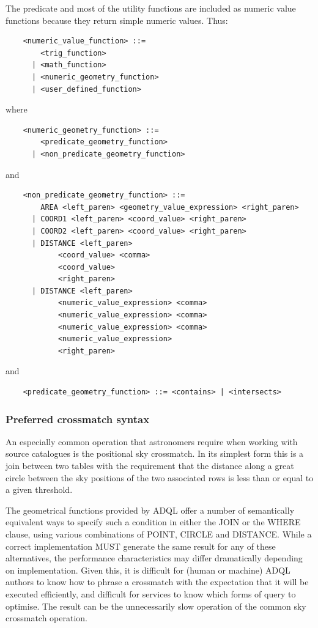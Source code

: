 \documentclass[11pt,a4paper]{ivoa}
\begin{document}
The predicate and most of the utility functions are included as numeric
value functions because they return simple numeric values.
Thus:
\begin{verbatim}
    <numeric_value_function> ::=
        <trig_function>
      | <math_function>
      | <numeric_geometry_function>
      | <user_defined_function>
\end{verbatim}
\noindent
where
\begin{verbatim}
    <numeric_geometry_function> ::=
        <predicate_geometry_function>
      | <non_predicate_geometry_function>
\end{verbatim}
\noindent
and
\begin{verbatim}
    <non_predicate_geometry_function> ::=
        AREA <left_paren> <geometry_value_expression> <right_paren>
      | COORD1 <left_paren> <coord_value> <right_paren>
      | COORD2 <left_paren> <coord_value> <right_paren>
      | DISTANCE <left_paren>
            <coord_value> <comma>
            <coord_value>
            <right_paren>
      | DISTANCE <left_paren>
            <numeric_value_expression> <comma>
            <numeric_value_expression> <comma>
            <numeric_value_expression> <comma>
            <numeric_value_expression>
            <right_paren>
\end{verbatim}
\noindent
and
\begin{verbatim}
    <predicate_geometry_function> ::= <contains> | <intersects>
\end{verbatim}

\subsubsection{Preferred crossmatch syntax}
\label{sec:functions.geom.crossmatch}

An especially common operation that astronomers require when working
with source catalogues is the positional sky crossmatch.
In its simplest form this is a join between two tables with the
requirement that the distance along a great circle between the
sky positions of the two associated rows is less than or equal to
a given threshold.

The geometrical functions provided by ADQL offer a number of
semantically equivalent ways to specify such a condition
in either the JOIN or the WHERE clause, using various 
combinations of POINT, CIRCLE and DISTANCE.
While a correct implementation MUST generate the same result for
any of these alternatives, the performance characteristics may
differ dramatically depending on implementation.
Given this, it is difficult for (human or machine) ADQL authors
to know how to phrase a crossmatch with the expectation that it
will be executed efficiently, and difficult for services to know
which forms of query to optimise.  The result can be the 
unnecessarily slow operation of the common sky crossmatch operation.
\end{document}
